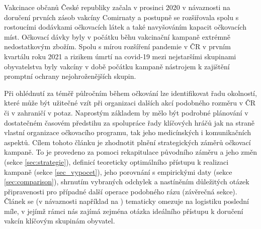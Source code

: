 Vakcinace občanů České republiky začala v prosinci 2020 v návaznosti na doručení prvních zásob vakcíny Comirnaty a postupně se rozšiřovala spolu s rostoucími dodávkami očkovacích látek a také navyšováním kapacit očkovacích míst. %
%
Očkovací dávky byly v počátku běhu vakcinační kampaně extrémně nedostatkovým zbožím. Spolu s mírou rozšíření pandemie v ČR v prvním kvartálu roku 2021 a rizikem úmrtí na covid-19 mezi nejstaršími skupinami obyvatelstva byly vakcíny v době počátku kampaně nástrojem k zajištění promptní ochrany nejohroženějších skupin. %

Při ohlédnutí za téměř půlročním během očkování lze identifikovat řadu okolností, které může být užitečné vzít při organizaci dalších akcí podobného rozměru v ČR či v zahraničí v potaz. Naprostým základem by mělo být podrobné plánování v dostatečném časovém předstihu za spolupráce řady klíčových hráčů jak na straně vlastní organizace očkovacího programu, tak jeho medicínských i komunikačních aspektů. 
%
Cílem tohoto článku je zhodnotit plnění strategických záměrů očkovací kampaně. To je provedeno za pomoci rekapitulace původního záměru a jeho změn (sekce \ref{sec:strategie}), definicí teoreticky optimálního přístupu k realizaci kampaně (sekce \ref{sec_vypocet}), jeho porovnání s empirickými daty (sekce \ref{sec:comparison}), shrnutím vybraných odchylek a nastíněním důležitých otázek připravenosti pro případné další operace podobného rázu (závěrečná sekce).
%
Článek se (v návaznosti například na \cite{lastmile}) tematicky omezuje na logistiku poslední míle, v jejímž rámci nás zajímá zejména otázka ideálního přístupu k doručení vakcín klíčovým skupinám obyvatel.

